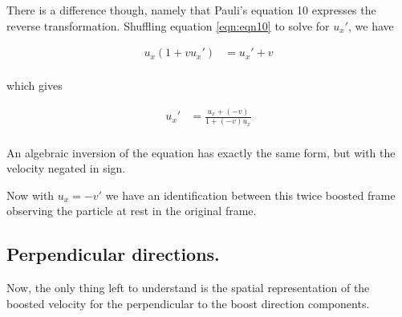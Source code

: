 \documentclass{article}
\begin{document}
There is a difference though, namely that Pauli's equation 10 expresses the reverse transformation.  Shuffling
equation \ref{eqn:eqn10} to solve for $u_x'$, we have

\begin{align*}
u_x ( 1 + v {u_x}') &= { {u_x}' + v  } \\
\end{align*}

which gives

\begin{align*}
u_x' &= \frac{ {u_x} + (-v)  }{ 1 + (-v) {u_x}} \\
\end{align*}

An algebraic inversion of the equation has exactly the same form, but with the velocity negated in sign.

Now with $u_x = -v'$ we have an identification between this twice boosted frame observing the particle at
rest in the original frame.

\subsection{ Perpendicular directions. }

Now, the only thing left to understand is the spatial representation of the boosted velocity 
for the perpendicular to the boost direction components.



\end{document}
